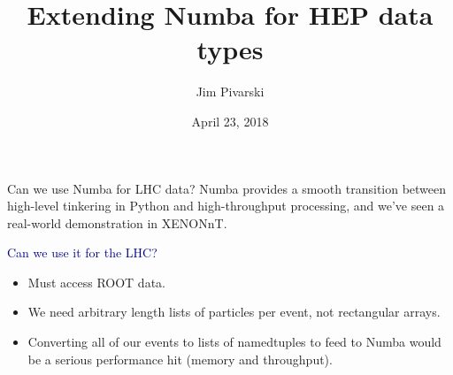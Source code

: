 \documentclass[aspectratio=169]{beamer}
\title[2018-04-23-dianahep-numba-oamap]{Extending Numba for HEP data types}
\author{Jim Pivarski}
\institute{Princeton University -- DIANA-HEP}
\date{April 23, 2018}
\begin{document}

\begin{frame}
  \titlepage
\end{frame}




\begin{frame}{Can we use Numba for LHC data?}
\vspace{0.5 cm}
Numba provides a smooth transition between high-level tinkering in Python and high-throughput processing, and we've seen a real-world demonstration in XENONnT.

\vspace{0.8 cm}
\textcolor{darkblue}{\Large Can we use it for the LHC?}

\vspace{0.2 cm}
\begin{itemize}
\item Must access ROOT data. 
\item We need arbitrary length lists of particles per event, not rectangular arrays.
\item Converting all of our events to lists of namedtuples to feed to Numba would be a serious performance hit (memory and throughput).

\vspace{0.2 cm}
\end{itemize}
\end{frame}
\end{document}
